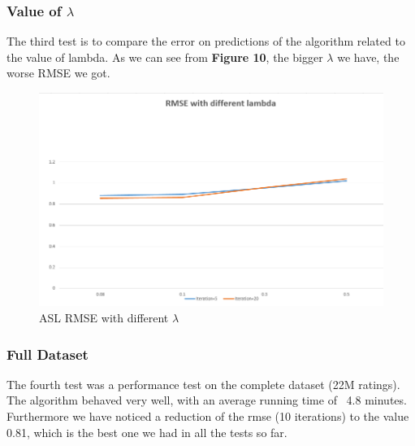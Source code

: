 \documentclass{sig-alternate-05-2015}
\begin{document}
        \subsubsection{Value of $\lambda$}
    The third test is to compare the error on predictions of the algorithm related to the value of lambda. As we can see from \textbf{Figure 10}, the bigger $\lambda$ we have, the worse RMSE we got.
\begin{figure}
    \caption{ASL RMSE with different $\lambda$}
    \centering
    \includegraphics[scale=0.4]{alslambda.png}
\end{figure}
        \subsubsection{Full Dataset}
     The fourth test was a performance test on the complete dataset (22M ratings). The algorithm behaved very well, with an average
    running time of ~4.8 minutes. Furthermore we have noticed a reduction of the rmse (10 iterations) to the value 0.81, which is the best one
    we had in all the tests so far.
\end{document}

